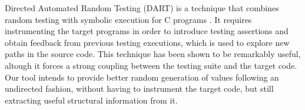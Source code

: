 %
%
Directed Automated Random Testing (DART) is a technique that combines random
testing with symbolic execution for C programs \cite{godefroid2005dart}.
%
It requires instrumenting the target programs in order to introduce testing
assertions and obtain feedback from previous testing executions, which is used
to explore new paths in the source code.
%
This technique has been shown to be remarkably useful, altough it forces a
strong coupling between the testing suite and the target code.
%
Our tool intends to provide better random generation of values following an
undirected fashion, without having to instrument the target code, but still
extracting useful structural information from it.
